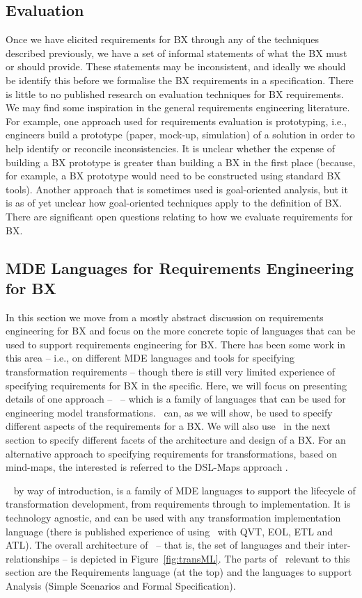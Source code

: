 \subsection{Evaluation}
Once we have elicited requirements for BX through any of the techniques described previously, we have a set of informal statements of what the BX must or should provide. These statements may be inconsistent, and ideally we should be identify this before we formalise the BX requirements in a specification. There is little to no published research on evaluation techniques for BX requirements. We may find some inspiration in the general requirements engineering literature. For example, one approach used for requirements evaluation is prototyping, i.e., engineers build a prototype (paper, mock-up, simulation) of a solution in order to help identify or reconcile inconsistencies. It is unclear whether the expense of building a BX prototype is greater than building a BX in the first place (because, for example, a BX prototype would need to be constructed using standard BX tools). Another approach that is sometimes used is goal-oriented analysis, but it is as of yet unclear  how goal-oriented techniques apply to the definition of BX. There are significant open questions relating to how we evaluate requirements for BX.

\subsection{MDE Languages for Requirements Engineering for BX}
In this section we move from a mostly abstract discussion on requirements engineering for BX and focus on the more concrete topic of languages that can be used to support requirements engineering for BX. There has been some work in this area -- i.e., on different MDE languages and tools for specifying transformation requirements -- though there is still very limited experience of specifying requirements for BX in the specific. Here, we will focus on presenting details of one approach -- \transml\ -- which is a family of languages that can be used for engineering model transformations. \transml\ can, as we will show, be used to specify different aspects of the requirements for a BX. We will also use \transml\ in the next section to specify different facets of the architecture and design of a BX. For an alternative approach to specifying requirements for transformations, based on mind-maps, the interested is referred to the DSL-Maps approach \cite{PescadorL16}.

\transml\ \cite{GuerraLKPS13} by way of introduction, is a family of MDE languages to support the lifecycle of transformation development, from requirements through to implementation. It is technology agnostic, and can be used with any transformation implementation language (there is published experience of using \transml\ with QVT, EOL, ETL and ATL). The overall architecture of \transml\ -- that is, the set of languages and their inter-relationships -- is depicted in Figure~\ref{fig:transML}. The parts of \transml\ relevant to this section are the Requirements language (at the top) and the languages to support Analysis (Simple Scenarios and Formal Specification).

